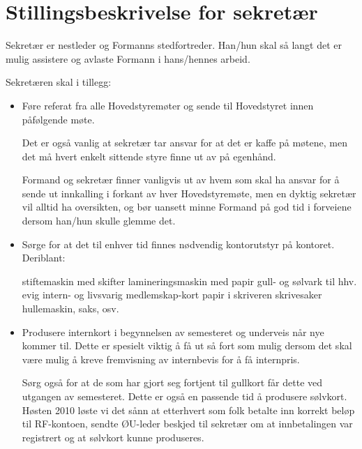 \section{Stillingsbeskrivelse for sekretær}

Sekretær er nestleder og Formanns stedfortreder.  Han/hun skal så langt det er
mulig assistere og avlaste Formann i hans/hennes arbeid.

Sekretæren skal i tillegg:
\begin{itemize}
    \item Føre referat fra alle
        Hovedstyremøter og sende til Hovedstyret innen påfølgende møte. 

        \subitem Det er også vanlig at sekretær tar ansvar for at det er kaffe
            på møtene, men det må hvert enkelt sittende styre finne ut av på
            egenhånd.

        \subitem Formand og sekretær finner vanligvis ut av hvem som skal ha
            ansvar for å sende ut innkalling i forkant av hver Hovedstyremøte,
            men en dyktig sekretær vil alltid ha oversikten, og bør uansett
            minne Formand på god tid i forveiene dersom han/hun skulle glemme
            det. 

    \item Sørge for at det til enhver tid finnes nødvendig kontorutstyr på
        kontoret.  Deriblant:

        \subitem stiftemaskin med skifter
        \subitem lamineringsmaskin med papir
        \subitem gull- og sølvark til hhv. evig intern- og livsvarig
            medlemskap-kort
        \subitem papir i skriveren
        \subitem skrivesaker
        \subitem hullemaskin, saks, osv. 

    \item Produsere internkort i begynnelsen av semesteret og underveis når nye
        kommer til. Dette er spesielt viktig å få ut så fort som mulig dersom
        det skal være mulig å kreve fremvisning av internbevis for å få
        internpris.

        \subitem Sørg også for at de som har gjort seg fortjent til gullkort får
            dette ved utgangen av semesteret. Dette er også en passende tid å
            produsere sølvkort. Høsten 2010 løste vi det sånn at etterhvert som
            folk betalte inn korrekt beløp til RF-kontoen, sendte ØU-leder
            beskjed til sekretær om at innbetalingen var registrert og at
            sølvkort kunne produseres. 


\end{itemize}

